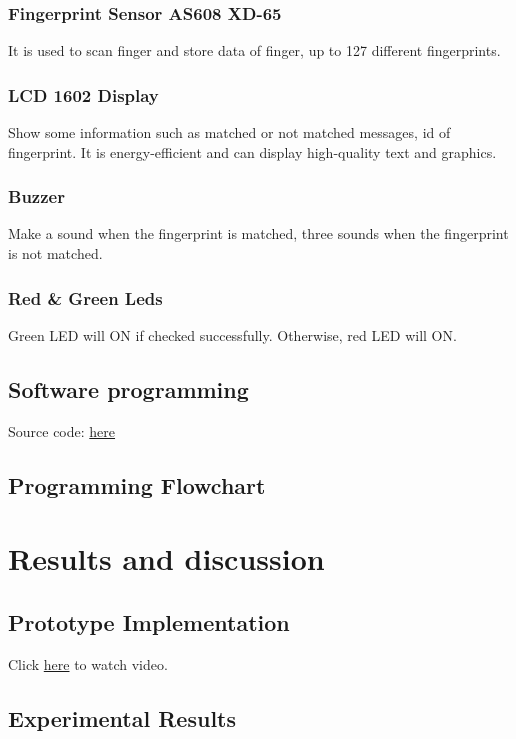 \documentclass[conference, doublecolumn]{IEEEtran}
\begin{document}
\subsubsection{Fingerprint Sensor AS608 XD-65}It is used to scan finger and store data of finger, up to 127 different fingerprints.
\subsubsection{LCD 1602 Display}Show some information such as matched or not matched messages, id of fingerprint. It is energy-efficient and can display high-quality
 text and graphics.
\subsubsection{Buzzer}Make a sound when the fingerprint is matched, three sounds when the fingerprint is not matched.
\subsubsection{Red \& Green Leds}Green LED will ON if checked successfully. Otherwise, red LED will ON.

\subsection{Software programming}
Source code: \href{https://drive.google.com/drive/folders/1Zr50cyBe2i8WDqsiBBCLub8rHfnfoXOh?usp=drive_link}{here}
\subsection{Programming Flowchart}

\section{\textbf{Results and discussion}}

\subsection{Prototype Implementation}
Click \href{https://youtu.be/Myt8jY4ko3I}{here} to watch video.
\subsection{Experimental Results}
\end{document}
